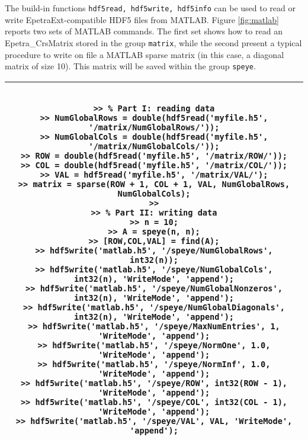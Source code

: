 \documentclass[11pt,relax]{SANDreport}
\begin{document}
The build-in functions {\tt hdf5read, hdf5write, hdf5info} can be used to read
or write EpetraExt-compatible HDF5 files from MATLAB. Figure \ref{fig:matlab}
reports two sets of MATLAB commands. The first set shows how to read an 
Epetra\_CrsMatrix stored in the group {\tt matrix}, while the second present
a typical procedure to write on file a MATLAB sparse matrix
(in this case, a diagonal matrix of size 10). This matrix will be saved within
the group {\tt speye}.

\begin{sidewaystable}
\begin{tabular}{| c |}
\hline
\begin{minipage}{22cm}
\begin{verbatim}

>> % Part I: reading data
>> NumGlobalRows = double(hdf5read('myfile.h5', '/matrix/NumGlobalRows/'));
>> NumGlobalCols = double(hdf5read('myfile.h5', '/matrix/NumGlobalCols/'));
>> ROW = double(hdf5read('myfile.h5', '/matrix/ROW/'));
>> COL = double(hdf5read('myfile.h5', '/matrix/COL/'));
>> VAL = hdf5read('myfile.h5', '/matrix/VAL/');
>> matrix = sparse(ROW + 1, COL + 1, VAL, NumGlobalRows, NumGlobalCols);
>>
>> % Part II: writing data
>> n = 10;
>> A = speye(n, n);
>> [ROW,COL,VAL] = find(A);
>> hdf5write('matlab.h5', '/speye/NumGlobalRows',      int32(n));
>> hdf5write('matlab.h5', '/speye/NumGlobalCols',      int32(n), 'WriteMode', 'append');
>> hdf5write('matlab.h5', '/speye/NumGlobalNonzeros',  int32(n), 'WriteMode', 'append');
>> hdf5write('matlab.h5', '/speye/NumGlobalDiagonals', int32(n), 'WriteMode', 'append');
>> hdf5write('matlab.h5', '/speye/MaxNumEntries', 1,   'WriteMode', 'append');
>> hdf5write('matlab.h5', '/speye/NormOne', 1.0,       'WriteMode', 'append');
>> hdf5write('matlab.h5', '/speye/NormInf', 1.0,       'WriteMode', 'append');
>> hdf5write('matlab.h5', '/speye/ROW', int32(ROW - 1),   'WriteMode', 'append');
>> hdf5write('matlab.h5', '/speye/COL', int32(COL - 1),   'WriteMode', 'append');
>> hdf5write('matlab.h5', '/speye/VAL', VAL, 'WriteMode', 'append');

\end{verbatim}
\end{minipage} \\
\hline
\end{tabular}
\caption{Example of input/output for HDF5 from MATLAB.
The use of {\tt double()} is required by sparse, which does not accept {\tt
  int32} data.  }
\label{fig:matlab}
\end{sidewaystable}
\end{document}
